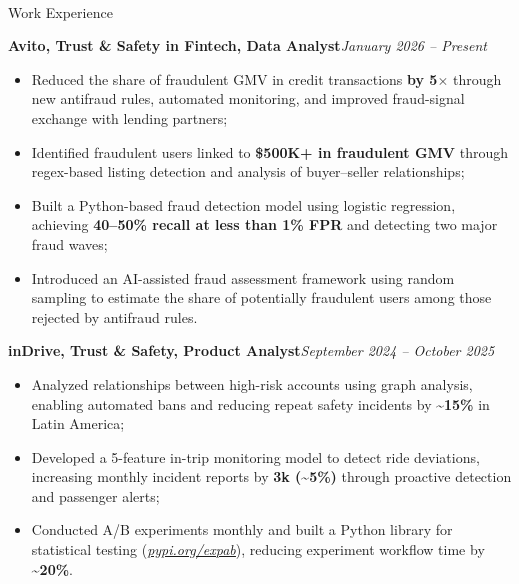 \documentclass[]{mcdowellcv}
\renewenvironment{cvsubsection}[2]{%
  \begin{adjustwidth}{\subsectionmargin}{\subsectionmargin}%
    {\bfseries #1}\hfill #2\par\vspace{0.67em}%
}{%
  \end{adjustwidth}%
  \vspace*{\aftersubsectionspace}%
}
\renewcommand{\makeheader}{%
  \begin{center}
    \printname\\[0.5em]%
    \printcontacts%
  \end{center}%
  \vspace*{\afterheaderspace}%
}
\begin{document}
	\makeheader
	
    	\begin{cvsection}{\Large Work Experience}
            \begin{cvsubsection}{Avito, Trust \& Safety in Fintech, Data Analyst}{\textit{January 2026 -- Present}}
          \begin{itemize}
            \item Reduced the share of fraudulent GMV in credit transactions \textbf{by 5$\times$} through new antifraud rules, automated monitoring, and improved fraud-signal exchange with lending partners;
            \item Identified fraudulent users linked to \textbf{\$500K+ in fraudulent GMV} through regex-based listing detection and analysis of buyer--seller relationships;
            \item Built a Python-based fraud detection model using logistic regression, achieving \textbf{40--50\% recall at less than 1\% FPR} and detecting two major fraud waves;
            \item Introduced an AI-assisted fraud assessment framework using random sampling to estimate the share of potentially fraudulent users among those rejected by antifraud rules.
          \end{itemize}
            \end{cvsubsection}
        
		\begin{cvsubsection}{inDrive, Trust \& Safety, Product Analyst}{\textit{September 2024 -- October 2025}}
			\begin{itemize}
				\item Analyzed relationships between high-risk accounts using graph analysis, enabling automated bans and reducing repeat safety incidents by \textbf{\textasciitilde 15\%} in Latin America;
				\item Developed a 5-feature in-trip monitoring model to detect ride deviations, increasing monthly incident reports by \textbf{3k (\textasciitilde 5\%)} through proactive detection and passenger alerts;
				\item Conducted A/B experiments monthly and built a Python library for statistical testing (\href{https://pypi.org/project/expab/}{\textit{\underline{pypi.org/expab}}}), reducing experiment workflow time by \textbf{\textasciitilde 20\%}.
			\end{itemize}
		\end{cvsubsection}
		

\end{cvsection}
\end{document}
